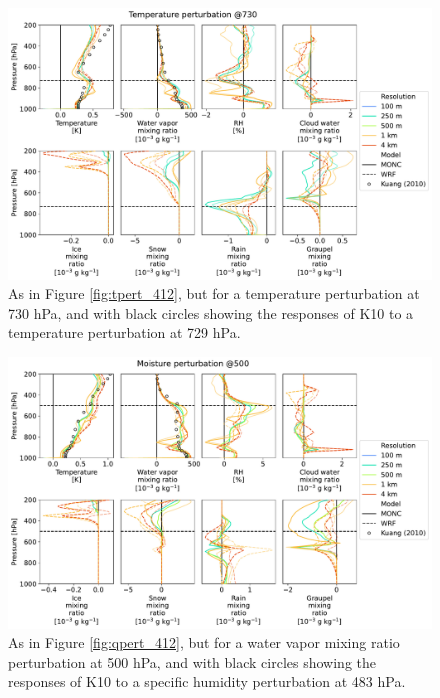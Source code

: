 \documentclass[draft]{agujournal2019}
\begin{document}
\begin{figure}[pth]
    \noindent\includegraphics[width=\textwidth]{figures/pert_diffs_T_0.5_@730}
    \caption{As in Figure \ref{fig:tpert_412}, but for a temperature
    perturbation at 730 hPa, and with black circles showing the responses of K10
    to a temperature perturbation at 729 hPa.}
    \label{fig:tpert_730}
\end{figure}

\begin{figure}[pth]
    \noindent\includegraphics[width=\textwidth]{figures/pert_diffs_q_0.0002_@500}
    \caption{As in Figure \ref{fig:qpert_412}, but for a water vapor mixing
    ratio perturbation at 500 hPa, and with black circles showing the responses
    of K10 to a specific humidity perturbation at 483 hPa.}
    \label{fig:qpert_500}
\end{figure}
\end{document}
